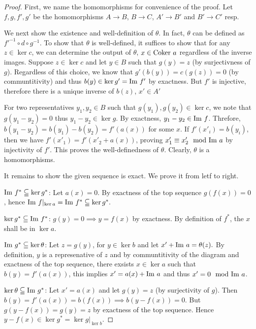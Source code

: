 \documentclass{article}
\theoremstyle{definition}
\theoremstyle{remark}
\begin{document}
\begin{proof}
    First, we name the homomorphisms for convenience of the proof. Let $f, g, f', g'$ be the homomorphisms $A \to B$, $B \to C$, $A' \to B'$ and $B' \to C'$ resp.

    We next show the existence and well-definition of $\theta$. In fact, $\theta$ can be defined as $f'^{-1} \circ d \circ g^{-1}$. To show that $\theta$ is well-defined, it suffices to show that for any $z \in \ker c$, we can determine the output of $\theta$, $x \in \mathrm{Coker \ } a$ regardless of the inverse images. Suppose $z \in \ker c$ and let $y \in B$ such that $g(y) = z$ (by surjectivness of $g$). Regardless of this choice, we know that $g'(b(y)) = c(g(z)) = 0$ (by communtitivity) and thus $b(y) \in \ker g' = \mathrm{Im}\  f'$ by exactness. But $f'$ is injective, therefore  there is a unique inverse of $b(z)$, $x' \in A'$

    For two representatives $y_1, y_2 \in B$ such that $g(y_1), g(y_2) \in \ker c$, we note that $g(y_1  - y_2) = 0$ thus $y_1 - y_2 \in \ker g.$ By exactness, $y_1 - y_2 \in \mathrm{Im}\  f$. Threfore, $b(y_1 - y_2) = b(y_1) - b(y_2) = f'(a(x))$ for some $x$. If $f'(x'_i) = b(y_i)$,  then we have $f'(x'_1) = f'(x'_2 + a(x))$, proving $x'_1 \equiv x'_2 \mod {\mathrm{Im}\ } a$ by injectivity of $f'$. This proves the well-definedness of $\theta$. Clearly, $\theta$ is a homomorphisms.

    It remains to show the given sequence is exact. We prove it from letf to right.

     $\mathrm{Im}\  f^* \subseteqq \ker g^*$: Let $a(x) = 0$. By exactness of the top sequence $g(f(x)) = 0$, hence $\mathrm{Im}\  f|_{\ker a} = \mathrm{Im}\  f^* \subseteqq \ker g^*.$

     $\ker g^* \subseteqq \mathrm{Im}\  f^*$: $g(y) = 0 \implies y = f(x)$ by exactness. By definition of $f^*$, the $x$ shall be in $\ker a$. 

     $\mathrm{Im}\  g^* \subseteqq \ker \theta$: Let $z = g(y)$, for $y \in \ker b$ and let $x' + \mathrm{Im}\  a = \theta(z).$ By definition, $y$ is a represenative of $z$ and by communtitivity of the diagram and exactness of the top sequence, there exsists $x \in \ker a$ such that $b(y) =  f'(a(x))$, this implies $x' = a(x) + \mathrm{Im}\  a$ and thus $x' = 0 \mod {\mathrm{Im}\ } a$. 

     $\ker \theta \subseteqq \mathrm{Im}\  g^*$: Let $x' = a(x)$ and let $g(y) = z$ (by surjectivity of $g$). Then $b(y) = f'(a(x)) = b(f(x)) \implies b(y - f(x)) = 0$. But $g(y - f(x)) = g(y) =  z$ by exactness of the top sequence. Hence $y - f(x)\in \ker g^* = \ker g|_{\ker b}.$
    

\end{proof}
\end{document}
